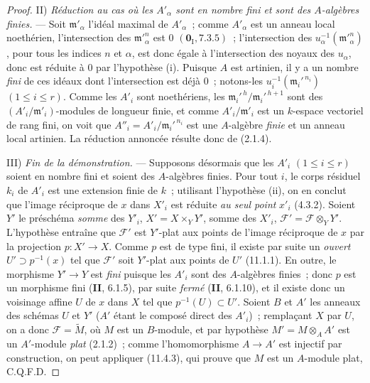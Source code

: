 \begin{proof}
\medskip
\noindent II) \emph{Réduction au cas où les $A'_\alpha$ sont en nombre
fini et sont des $A$-algèbres finies.} --- Soit $\mathfrak m'_\alpha$ l'idéal
maximal de $A'_\alpha$~; comme $A'_\alpha$ est un anneau local noethérien,
l'intersection des $\mathfrak m'^n_\alpha$ est $0$ $(\mathbf 0_{\mathrm I},7.3.5)$~;
l'intersection des $u_\alpha^{-1}(\mathfrak m'^n_\alpha)$, pour tous les indices
$n$ et $\alpha$, est donc égale à l'intersection des noyaux des $u_\alpha$, donc
est réduite à $0$ par l'hypothèse (i). Puisque $A$ est artinien, il y a un nombre
\emph{fini} de ces idéaux dont l'intersection est déjà $0$~; notons-les
$u_i^{-1}(\mathfrak m_i'^{\,n_i})$ $(1\leq i\leq r)$. Comme les $A'_i$ sont
noethériens, les $\mathfrak m_i'^{\,h}/\mathfrak m_i'^{\,h+1}$ sont des
$(A'_i/\mathfrak m'_i)$-modules de longueur finie, et comme
$A'_i/\mathfrak m'_i$ est un $k$-espace vectoriel de rang fini, on voit que
$A''_i=A'_i/\mathfrak m_i'^{\,n_i}$ est une $A$-algèbre \emph{finie} et un anneau local
artinien. La réduction annoncée résulte donc de (2.1.4).

\medskip
\noindent III) \emph{Fin de la démonstration.} --- Supposons désormais
que les $A'_i$ $(1\leq i\leq r)$ soient en nombre fini et soient des
$A$-algèbres finies. Pour tout $i$, le corps résiduel $k_i$ de $A'_i$ est une
extension finie de $k$~; utilisant l'hypothèse (ii), on en conclut que l'image
réciproque de $x$ dans $X'_i$ est réduite \emph{au seul point} $x'_i$ (4.3.2). Soient
$Y'$ le préschéma \emph{somme} des $Y'_i$, $X'=X\times_Y Y'$, somme des $X'_i$,
$\mathcal F'=\mathcal F\otimes_Y Y'$. L'hypothèse entraîne que
$\mathcal F'$ est $Y'$-plat aux points de l'image réciproque de $x$ par la
projection $p:X'\to X$. Comme $p$ est de type fini, il existe par suite un
\emph{ouvert} $U'\supset p^{-1}(x)$ tel que $\mathcal F'$ soit $Y'$-plat aux points de
$U'$ (11.1.1). En outre, le morphisme $Y'\to Y$ est \emph{fini} puisque les $A'_i$
sont des $A$-algèbres finies~; donc $p$ est un morphisme fini (\textbf{II},
6.1.5), par suite \emph{fermé} (\textbf{II}, 6.1.10), et il existe donc un voisinage
affine $U$ de $x$ dans $X$ tel que $p^{-1}(U)\subset U'$. Soient $B$ et $A'$
les anneaux des schémas $U$ et $Y'$ ($A'$ étant le composé direct des $A'_i$)~;
remplaçant $X$ par $U$, on a donc $\mathcal F=\widetilde M$, où $M$ est un
$B$-module, et par hypothèse $M'=M\otimes_A A'$ est un $A'$-module \emph{plat}
(2.1.2)~; comme l'homomorphisme $A\to A'$ est injectif par construction, on
peut appliquer (11.4.3), qui prouve que $M$ est un $A$-module plat, C.Q.F.D.
\end{proof}


